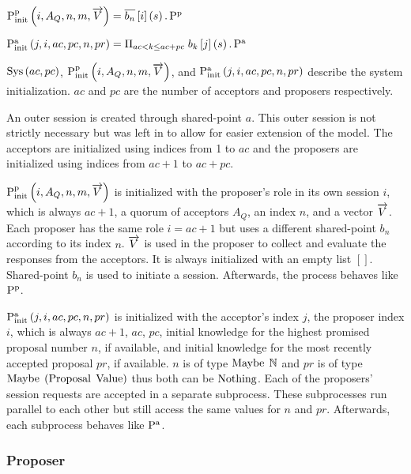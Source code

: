 $\operatorname{P^p_{init}}\left(i, A_Q, n, m, \overrightarrow{V}\right) = \overline{b_n}\left[i\right]\left(s\right) . \operatorname{P^p}$

$\operatorname{P^a_{init}}\left(j, i, ac, pc, n, pr\right) = \Pi_{ac < k \le ac + pc}\; b_k\left[j\right]\left(s\right) . \operatorname{P^a}$

$\operatorname{Sys}\left(ac, pc\right)$, $\operatorname{P^p_{init}}\left(i, A_Q, n, m, \overrightarrow{V}\right)$, and $\operatorname{P^a_{init}}\left(j, i, ac, pc, n, pr\right)$ describe the system initialization.
$ac$ and $pc$ are the number of acceptors and proposers respectively.

An outer session is created through shared-point $a$.
This outer session is not strictly necessary but was left in to allow for easier extension of the model.
The acceptors are initialized using indices from 1 to $ac$ and the proposers are initialized using indices from $ac + 1$ to $ac + pc$.

$\operatorname{P^p_{init}}\left(i, A_Q, n, m, \overrightarrow{V}\right)$ is initialized with the proposer's role in its own session $i$, which is always $ac + 1$, a quorum of acceptors $A_Q$, an index $n$, and a vector $\overrightarrow{V}$.
Each proposer has the same role $i = ac + 1$ but uses a different shared-point $b_n$ according to its index $n$.
$\overrightarrow{V}$ is used in the proposer to collect and evaluate the responses from the acceptors.
It is always initialized with an empty list $[]$.
Shared-point $b_n$ is used to initiate a session.
Afterwards, the process behaves like $\operatorname{P^p}$.

$\operatorname{P^a_{init}}\left(j, i, ac, pc, n, pr\right)$ is initialized with the acceptor's index $j$, the proposer index $i$, which is always $ac + 1$, $ac$, $pc$, initial knowledge for the highest promised proposal number $n$, if available, and initial knowledge for the most recently accepted proposal $pr$, if available.
$n$ is of type $\operatorname{Maybe}\; \mathbb{N}$ and $pr$ is of type $\operatorname{Maybe}\; \left(\operatorname{Proposal}\; \operatorname{Value}\right)$ thus both can be $\operatorname{Nothing}$.
Each of the proposers' session requests are accepted in a separate subprocess.
These subprocesses run parallel to each other but still access the same values for $n$ and $pr$.
Afterwards, each subprocess behaves like $\operatorname{P^a}$.

\subsubsection{Proposer}
\newcommand{\SendUnreliableP}[5]{#1\left[#2, #3\right]!_u #4 \left\langle #5 \right\rangle}
\newcommand{\ReceiveUnreliableP}[6]{#1\left[#2, #3\right]?_u #4 \left\langle #5 \right\rangle \left(#6\right)}
\newcommand{\ceil}[1]{\Big\lceil #1 \Big\rceil}
\newcommand{\SendWeaklyP}[5]{#1\left[#2, #3\right]!_w #4.#5}
\newcommand{\ReceiveWeaklyP}[4]{#1\left[#2, #3\right]?_w #4}
\newcommand{\If}[1]{\operatorname{if}\; #1}
\newcommand{\Then}[1]{\operatorname{then}\; #1}
\newcommand{\Else}[1]{\operatorname{else}\; #1}
\newcommand{\update}[2]{\operatorname{update} \left(#1, #2\right)}
\newcommand{\tOr}[0]{\text{ or }}

